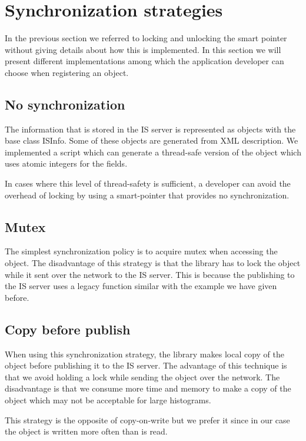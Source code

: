 \section*{Synchronization strategies}
In the previous section we referred to locking and unlocking the smart pointer without giving details about how this is implemented. In this section we will present different implementations among which the application developer can choose when registering an object.

\subsection*{No synchronization}

The information that is stored in the IS server is represented as objects with the base class ISInfo. Some of these objects are generated from XML description. We implemented a script which can generate a thread-safe version of the object which uses atomic integers for the fields. 

In cases where this level of thread-safety is sufficient, a developer can avoid the overhead of locking by using a smart-pointer that provides no synchronization.

\subsection*{Mutex}

The simplest synchronization policy is to acquire mutex when accessing the object. The disadvantage of this strategy is that the library has to lock the object while it sent over the network to the IS server. This is because the publishing to the IS server uses a legacy function similar with the example we have given before.

\subsection*{Copy before publish}

When using this synchronization strategy, the library makes local copy of the object before publishing it to the IS server. The advantage of this technique is that we avoid holding a lock while sending the object over the network. The disadvantage is that we consume more time and memory to make a copy of the object which may not be acceptable for large histograms.

This strategy is the opposite of copy-on-write but we prefer it since in our case the object is written more often than is read.

